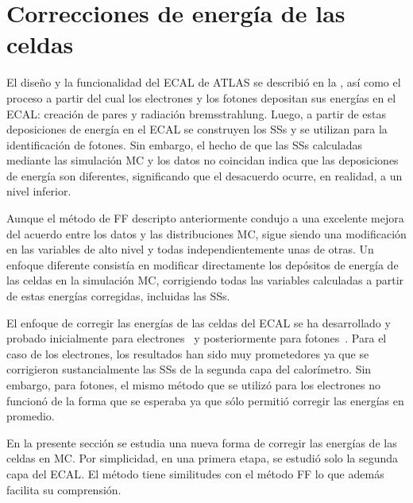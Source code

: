 \section{Correcciones de energía de las celdas}
\label{sec:ss_corrections:cell_rw}

El diseño y la funcionalidad del \ac{ECAL} de \ac{ATLAS} se describió en la \Sect{\ref{subsubsec:atlas:atlas:cals:ecal}}, así como el proceso a partir del cual los electrones y los fotones depositan sus energías en el \ac{ECAL}: creación de pares y radiación bremsstrahlung. Luego, a partir de estas deposiciones de energía en el \ac{ECAL} se construyen los \acp{SS} y se utilizan para la identificación de fotones. Sin embargo, el hecho de que las \acp{SS} calculadas mediante las simulación \ac{MC} y los datos no coincidan indica que las deposiciones de energía son diferentes, significando que el desacuerdo ocurre, en realidad, a un nivel inferior.

Aunque el método de \ac{FF} descripto anteriormente condujo a una excelente mejora del acuerdo entre los datos y las distribuciones \ac{MC}, sigue siendo una modificación en las variables de alto nivel y todas independientemente unas de otras. Un enfoque diferente consistía en modificar directamente los depósitos de energía de las celdas en la simulación \ac{MC}, corrigiendo todas las variables calculadas a partir de estas energías corregidas, incluidas las \acp{SS}.


El enfoque de corregir las energías de las celdas del \ac{ECAL} se ha desarrollado y probado inicialmente para electrones~\cite{thesis_khandoga} y posteriormente para fotones~\cite{thesis_belfkir}. Para el caso de los electrones, los resultados han sido muy prometedores ya que se corrigieron sustancialmente las \acp{SS} de la segunda capa del calorímetro. Sin embargo, para fotones, el mismo método que se utilizó para los electrones no funcionó de la forma que se esperaba ya que sólo permitió corregir las energías en promedio.

En la presente sección se estudia una nueva forma de corregir las energías de las celdas en \ac{MC}. Por simplicidad, en una primera etapa, se estudió solo la segunda capa del \ac{ECAL}. El método tiene similitudes con el método \ac{FF} lo que además facilita su comprensión.







